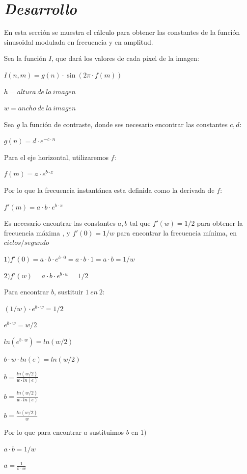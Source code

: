 \documentclass[conference]{IEEEtran}
\def\shadowLine{\vspace{3mm}}
\begin{document}
\section{\textit{Desarrollo}}

En esta sección se muestra el cálculo para obtener las constantes de la función sinusoidal modulada en frecuencia y en amplitud.

Sea la función $I$, que dará los valores de cada pixel de la imagen:

$I(n,m) = g(n)\cdot \sin(2\pi\cdot f(m))$

$h = altura\ de\ la\ imagen$

$w =  ancho\ de\ la\ imagen$

Sea $g$ la función de contraste, donde ses necesario encontrar las constantes $c,d$:

$g(n)=d\cdot e^{-c\cdot n}$

Para el eje horizontal, utilizaremos $f$:

$f(m) = a\cdot e^{b\cdot x}$

Por lo que la frecuencia instantánea esta definida como la derivada de $f$:

$f'(m) = a\cdot b\cdot e^{b\cdot x}$

Es necesario encontrar las constantes $a,b$ tal que $f'(w) = 1/2$ para obtener la frecuencia máxima , y $f'(0) = 1/w$ para encontrar la frecuencia mínima, en $ciclos/segundo$

$1)f'(0) = a\cdot b\cdot e^{b\cdot 0} = a\cdot b \cdot 1= a\cdot b = 1/w$

$2)f'(w) = a\cdot b\cdot e^{b\cdot w} = 1/2$

Para encontrar $b$, sustituir $1\ en\ 2$:

$(1/w)\cdot e^{b\cdot w} = 1/2$

\shadowLine
$e^{b\cdot w} = w/2$

\shadowLine
$ln(e^{b\cdot w}) = ln(w/2)$

\shadowLine
$b\cdot w\cdot ln(e) = ln(w/2)$

\shadowLine
$b = \displaystyle\frac{ln(w/2)}{w\cdot ln(e)}  $

\shadowLine
$b = \displaystyle\frac{ln(w/2)}{w\cdot ln(e)}  $

\shadowLine
$b = \displaystyle\frac{ln(w/2)}{w}  $

Por lo que para encontrar $a$ sustituimos $b$ en $1)$

$a\cdot b = 1/w$

\shadowLine
$a = \displaystyle\frac{1}{b\cdot w}$
\end{document}
